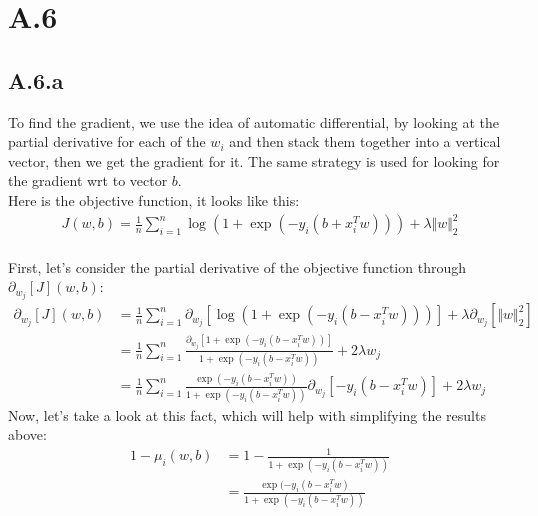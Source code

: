 \documentclass[]{article}
\begin{document}
\section*{A.6}
    \subsection*{A.6.a}
        To find the gradient, we use the idea of automatic differential, by looking at the partial derivative for each of the $w_i$ and then stack them together into a vertical vector, then we get the gradient for it. The same strategy is used for looking for the gradient wrt to vector $b$. 
        \\
        Here is the objective function, it looks like this: 
        \begin{align*}\tag{A.6.a.1}\label{eqn:A.6.a.1}
            J(w, b) = \frac{1}{n}\sum_{i = 1}^{n}
                \log(1 + \exp(-y_i(b + x^T_iw))) 
                +
                \lambda \Vert w\Vert_2^2
        \end{align*}
        \\
        First, let's consider the partial derivative of the objective function through $\partial_{w_j}[J](w, b)$: 
        \begin{align*}\tag{A.6.a.2}\label{eqn:A.6.a.2}
            \partial_{w_j}[J](w, b) 
            &=
            \frac{1}{n}\sum_{i  = 1}^{n}
            \partial_{w_j}\left[
                    \log \left(
                        1 + \exp(-y_i(b - x_i^T w))
                    \right)
                \right]
            + \lambda\partial_{w_j}[\Vert w\Vert_2^2]
            \\
            &= 
            \frac{1}{n}\sum_{i  = 1}^{n}
                \frac{
                    \partial_{w_j}[1 + \exp(-y_i(b - x_i^T w))]
                }
                {
                    1 + \exp(-y_i(b - x_i^T w))
                }
                +
                2\lambda w_j
            \\
            &= 
            \frac{1}{n}\sum_{i  = 1}^{n}
                \frac{
                    \exp(-y_i(b - x_i^T w))
                }
                {
                    1 + \exp(-y_i(b - x_i^T w))
                }\partial_{w_j}[-y_i(b - x_i^Tw)]
                + 2\lambda w_j
        \end{align*}
        Now, let's take a look at this fact, which will help with simplifying the results above: 
        \begin{align*}\tag{A.6.a.3}\label{eqn:A.6.a.3}
            1 - \mu_i(w, b) &= 
            1 - \frac{1}{1 + \exp(-y_i(b - x_i^T w))}
            \\
            &= 
            \frac{\exp(-y_i(b - x_i^T w)}{1 + \exp(-y_i(b - x_i^T w))}
        \end{align*}
\end{document}
